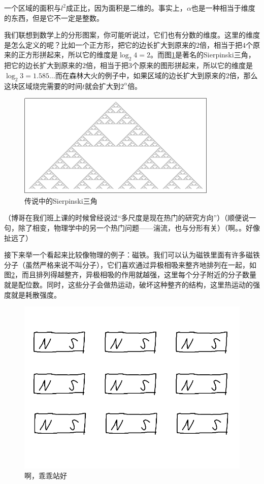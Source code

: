 一个区域的面积与$l^2$成正比，因为面积是二维的。事实上，$\alpha$也是一种相当于维度的东西，但是它不一定是整数。

我们联想到数学上的分形图案，你可能听说过，它们也有分数的维度。这里的维度是怎么定义的呢？比如一个正方形，把它的边长扩大到原来的$2$倍，相当于把$4$个原来的正方形拼起来，所以它的维度是$\log_2 4=2$。而图\ref{fig-sierpinski}是著名的Sierpinski三角，把它的边长扩大到原来的$2$倍，相当于把$3$个原来的图形拼起来，所以它的维度是$\log_2 3=1.585 \dots$而在森林大火的例子中，如果区域的边长扩大到原来的$2$倍，那么这块区域烧完需要的时间$t$就会扩大到$2^{\alpha}$倍。
\begin{figure}[htb]
\centering
\includegraphics[scale=1]{fig/sierpinski}
\caption{传说中的Sierpinski三角}
\label{fig-sierpinski}
\end{figure}

（博哥在我们班上课的时候曾经说过“多尺度是现在热门的研究方向”）（顺便说一句，除了相变，物理学中的另一个热门问题——湍流，也与分形有关）（啊。。好像扯远了）

接下来举一个看起来比较像物理的例子：磁铁。我们可以认为磁铁里面有许多磁铁分子（虽然严格来说不叫分子），它们喜欢通过异极相吸来整齐地排列在一起，如图\ref{fig-magnet-mole}，而且排列得越整齐，异极相吸的作用就越强，这里每个分子附近的分子数量就是配位数。同时，这些分子会做热运动，破坏这种整齐的结构，这里热运动的强度就是耗散强度。
\begin{figure}[htb]
\centering
\includegraphics[scale=0.5]{fig/magnet-mole}
\caption{啊，乖乖站好}
\label{fig-magnet-mole}
\end{figure}

